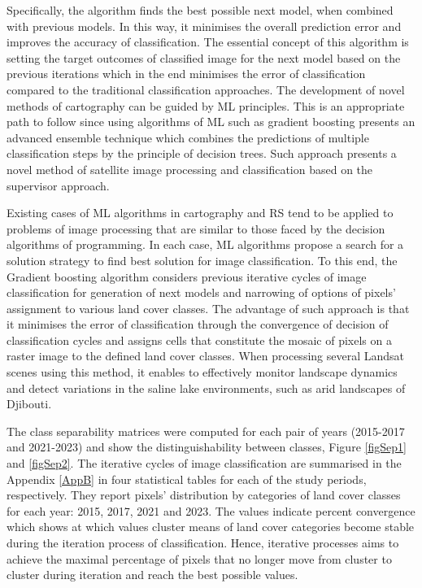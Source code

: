 \documentclass[jimaging,article,submit,pdftex,moreauthors]{Definitions/mdpi}
\begin{document}
Specifically, the algorithm finds the best possible next model, when combined with previous models. In this way, it minimises the overall prediction error and improves the accuracy of classification. The essential concept of this algorithm is setting the target outcomes of classified image for the next model based on the previous iterations which in the end minimises the error of classification compared to the traditional classification approaches. The development of novel methods of cartography can be guided by ML principles. This is an appropriate path to follow since using algorithms of ML such as gradient boosting presents an advanced ensemble technique which combines the predictions of multiple classification steps by the principle of decision trees. Such approach presents a novel method of satellite image processing and classification based on the supervisor approach. 

Existing cases of ML algorithms in cartography and RS tend to be applied to problems of image processing that are similar to those faced by the decision algorithms of programming. In each case, ML algorithms propose a search for a solution strategy to find best solution for image classification. To this end,{ }the Gradient boosting algorithm considers previous iterative cycles of image classification for generation of next models and narrowing of options of pixels' assignment to various land cover classes. The advantage of such approach is that it minimises the error of classification through the convergence of decision of classification cycles and assigns cells that constitute the mosaic of pixels on a raster image to the defined land cover classes. When processing several Landsat scenes using this method, it enables to effectively monitor landscape dynamics and detect variations in the saline lake environments, such as arid landscapes of Djibouti. 

The class separability matrices were computed for each pair of years (2015-2017 and 2021-2023) and show the distinguishability between classes, Figure \ref{figSep1} and \ref{figSep2}. The iterative cycles of image classification are summarised in the Appendix \ref{AppB} in four statistical tables for each of the study periods, respectively. {They report pixels' distribution by categories of land cover classes for each year: 2015, 2017, 2021 and 2023. The values indicate percent convergence which shows at which values cluster means of land cover categories become stable during the iteration process of classification. Hence, iterative processes aims to achieve the maximal percentage of pixels that no longer move from cluster to cluster during iteration and reach the best possible values.} 
\end{document}
